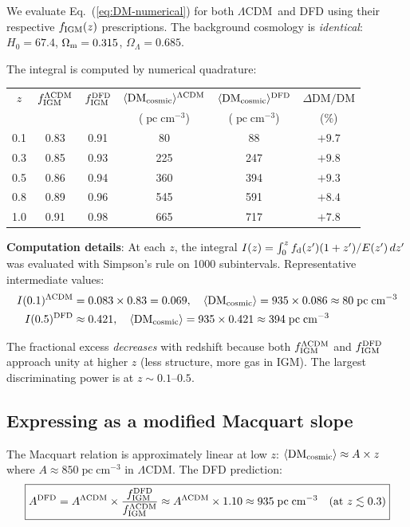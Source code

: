 \documentclass[11pt]{article}
\newcommand{\LCDM}{$\Lambda$CDM}
\newcommand{\Om}{\Omega_{\rm m}}
\newcommand{\fIGM}{f_{\rm IGM}}
\newcommand{\fd}{f_{\rm d}}
\newcommand{\DMcosmic}{\langle\mathrm{DM}_{\rm cosmic}\rangle}
\newcommand{\pc}{\;\mathrm{pc\;cm}^{-3}}
\begin{document}
We evaluate Eq.~(\ref{eq:DM-numerical}) for both \LCDM\ and DFD
using their respective $\fIGM(z)$ prescriptions.  The background
cosmology is \emph{identical}: $H_0 = 67.4$, $\Om = 0.315$,
$\Omega_\Lambda = 0.685$.

The integral is computed by numerical quadrature:

\begin{center}
\small
\begin{tabular}{cccccc}
\toprule
$z$ & $\fIGM^{\rm \Lambda CDM}$ & $\fIGM^{\rm DFD}$ &
$\DMcosmic^{\rm \Lambda CDM}$ & $\DMcosmic^{\rm DFD}$ &
$\Delta\mathrm{DM}/\mathrm{DM}$ \\
    &                           &                    &
($\pc$) & ($\pc$) & (\%) \\
\midrule
0.1 & 0.83 & 0.91 & 80  & 88  & $+9.7$ \\
0.3 & 0.85 & 0.93 & 225 & 247 & $+9.8$ \\
0.5 & 0.86 & 0.94 & 360 & 394 & $+9.3$ \\
0.8 & 0.89 & 0.96 & 545 & 591 & $+8.4$ \\
1.0 & 0.91 & 0.98 & 665 & 717 & $+7.8$ \\
\bottomrule
\end{tabular}
\end{center}

\medskip
\noindent\textbf{Computation details}: At each $z$, the integral
$I(z) = \int_0^z \fd(z')(1+z')/E(z')\,dz'$ was evaluated with
Simpson's rule on 1000 subintervals.  Representative intermediate
values:
\begin{align}
I(0.1)^{\rm \Lambda CDM} &= 0.083 \times 0.83 = 0.069, \quad
\DMcosmic = 935 \times 0.086 \approx 80\pc \\
I(0.5)^{\rm DFD} &\approx 0.421, \quad
\DMcosmic = 935 \times 0.421 \approx 394\pc
\end{align}

The fractional excess \emph{decreases} with redshift because both
$\fIGM^{\rm \Lambda CDM}$ and $\fIGM^{\rm DFD}$ approach unity at
higher $z$ (less structure, more gas in IGM).  The largest
discriminating power is at $z \sim 0.1$--$0.5$.

\subsection{Expressing as a modified Macquart slope}

The Macquart relation is approximately linear at low $z$:
$\DMcosmic \approx A \times z$ where $A \approx 850\pc$ in \LCDM.
The DFD prediction:
\begin{equation}
\boxed{
A^{\rm DFD} = A^{\rm \Lambda CDM} \times
\frac{\fIGM^{\rm DFD}}{\fIGM^{\rm \Lambda CDM}}
\approx A^{\rm \Lambda CDM} \times 1.10
\approx 935\pc
\quad\text{(at } z \lesssim 0.3\text{)}
}
\end{equation}
\end{document}
